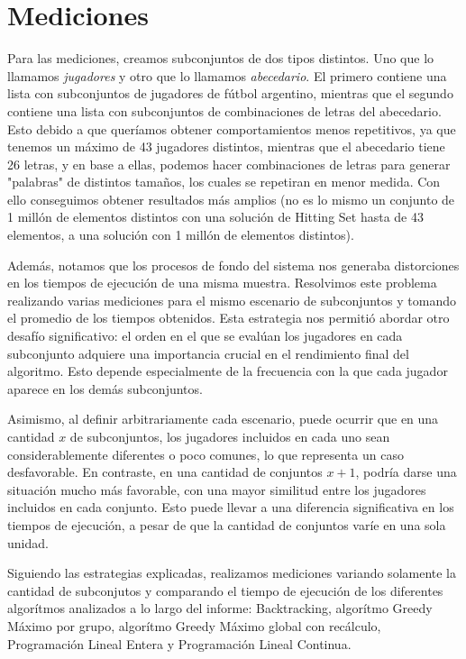 \section{Mediciones}

Para las mediciones, creamos subconjuntos de dos tipos distintos. Uno que lo llamamos \textit{jugadores} y otro que lo llamamos \textit{abecedario}.
El primero contiene una lista con subconjuntos de jugadores de fútbol argentino, mientras que el segundo contiene una lista con subconjuntos de combinaciones de letras del abecedario. Esto debido a que queríamos obtener comportamientos menos repetitivos, ya que tenemos un máximo de 43 jugadores distintos, mientras que el abecedario tiene 26 letras, y en base a ellas, podemos hacer combinaciones de letras para generar "palabras" de distintos tamaños, los cuales se repetiran en menor medida.
Con ello conseguimos obtener resultados más amplios (no es lo mismo un conjunto de 1 millón de elementos distintos con una solución de Hitting Set hasta de 43 elementos, a una solución con 1 millón de elementos distintos).

Además, notamos que los procesos de fondo del sistema nos generaba distorciones en los tiempos de ejecución de una misma muestra. Resolvimos este problema
realizando varias mediciones para el mismo escenario de subconjuntos y tomando el promedio de los tiempos obtenidos. Esta estrategia nos permitió abordar otro desafío significativo: el orden en el que se evalúan los jugadores en cada subconjunto adquiere una importancia crucial en el rendimiento final del algoritmo. Esto depende especialmente de la frecuencia con la que cada jugador aparece en los demás subconjuntos. 

Asimismo, al definir arbitrariamente cada escenario, puede ocurrir que en una cantidad 
$x$ de subconjuntos, los jugadores incluidos en cada uno sean considerablemente diferentes o poco comunes, lo que representa un caso desfavorable. En contraste, en una cantidad de conjuntos $x+1$, podría darse una situación mucho más favorable, con una mayor similitud entre los jugadores incluidos en cada conjunto. Esto puede llevar a una diferencia significativa en los tiempos de ejecución, a pesar de que la cantidad de conjuntos varíe en una sola unidad.

Siguiendo las estrategias explicadas, realizamos mediciones variando solamente la cantidad de subconjutos y comparando el tiempo de ejecución de los diferentes algorítmos analizados a lo largo del informe: Backtracking, algorítmo Greedy Máximo por grupo, algorítmo Greedy Máximo global con recálculo, Programación Lineal Entera y Programación Lineal Continua.

